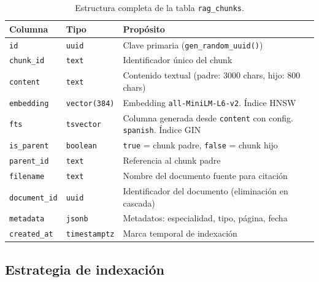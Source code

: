 \begin{table}[H]
\centering
\caption{Estructura completa de la tabla \texttt{rag\_chunks}.}
\label{tab:appendix_ragchunks}
\footnotesize
\begin{tabularx}{\columnwidth}{llX}
\toprule
\textbf{Columna} & \textbf{Tipo} & \textbf{Propósito} \\
\midrule
\texttt{id} & \texttt{uuid} & Clave primaria (\texttt{gen\_random\_uuid()}) \\
\texttt{chunk\_id} & \texttt{text} & Identificador único del chunk \\
\texttt{content} & \texttt{text} & Contenido textual (padre: 3000 chars, hijo: 800 chars) \\
\texttt{embedding} & \texttt{vector(384)} & Embedding \texttt{all-MiniLM-L6-v2}. Índice \ac{HNSW} \\
\texttt{fts} & \texttt{tsvector} & Columna generada desde \texttt{content} con config. \texttt{spanish}. Índice \ac{GIN} \\
\texttt{is\_parent} & \texttt{boolean} & \texttt{true} = chunk padre, \texttt{false} = chunk hijo \\
\texttt{parent\_id} & \texttt{text} & Referencia al chunk padre \\
\texttt{filename} & \texttt{text} & Nombre del documento fuente para citación \\
\texttt{document\_id} & \texttt{uuid} & Identificador del documento (eliminación en cascada) \\
\texttt{metadata} & \texttt{jsonb} & Metadatos: especialidad, tipo, página, fecha \\
\texttt{created\_at} & \texttt{timestamptz} & Marca temporal de indexación \\
\bottomrule
\end{tabularx}
\end{table}

\subsection{Estrategia de indexación}


